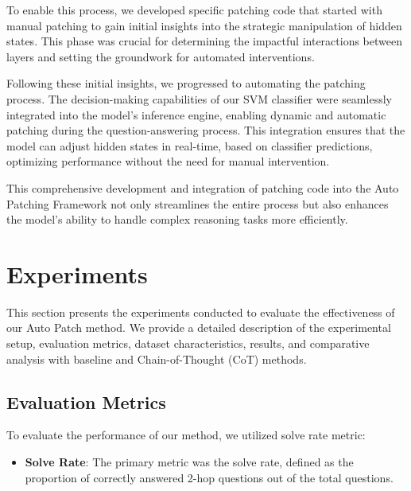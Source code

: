 \documentclass[11pt]{article}
\begin{document}
To enable this process, we developed specific patching code that started with manual patching to gain initial insights into the strategic manipulation of hidden states. This phase was crucial for determining the impactful interactions between layers and setting the groundwork for automated interventions.

Following these initial insights, we progressed to automating the patching process. The decision-making capabilities of our SVM classifier were seamlessly integrated into the model’s inference engine, enabling dynamic and automatic patching during the question-answering process. This integration ensures that the model can adjust hidden states in real-time, based on classifier predictions, optimizing performance without the need for manual intervention.

This comprehensive development and integration of patching code into the Auto Patching Framework not only streamlines the entire process but also enhances the model’s ability to handle complex reasoning tasks more efficiently.


\section{Experiments}

This section presents the experiments conducted to evaluate the effectiveness of our Auto Patch method. We provide a detailed description of the experimental setup, evaluation metrics, dataset characteristics, results, and comparative analysis with baseline and Chain-of-Thought (CoT) methods.

\subsection{Evaluation Metrics}

To evaluate the performance of our method, we utilized solve rate metric:

\begin{itemize}
    \item \textbf{Solve Rate}: The primary metric was the solve rate, defined as the proportion of correctly answered 2-hop questions out of the total questions.
\end{itemize}
\end{document}
